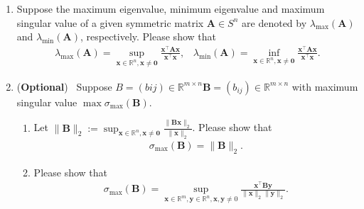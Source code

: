 \documentclass[11pt,letter,notitlepage]{article}
\theoremstyle{definition}
\begin{document}
\newpage
    \begin{exercise}
    \begin{enumerate}
        \item Suppose the maximum eigenvalue, minimum eigenvalue and maximum singular value of a given symmetric matrix $\mathbf{A}\in S^n$ are denoted by $\lambda_{\max}(\mathbf{A})$ and $ \lambda_{\min}(\mathbf{A})$, respectively. Please show that
        \begin{align*}
            \lambda_{\max}(\mathbf{A})=\sup_{\mathbf{x}\in\mathbb{R}^n, \mathbf{x}\not=\mathbf{0}} \frac{\mathbf{x}^\top\mathbf{A}\mathbf{x}}{\mathbf{x}^\top\mathbf{x}},\,\,\,\,\,
            \lambda_{\min}(\mathbf{A})=\inf_{\mathbf{x}\in\mathbb{R}^n, \mathbf{x}\not=\mathbf{0}} \frac{\mathbf{x}^\top\mathbf{A}\mathbf{x}}{\mathbf{x}^\top\mathbf{x}}.
        \end{align*}

        \item (\textbf{Optional}) ~Suppose $B=(bij)\in \mathbb{R}^{m\times n}\mathbf{B}=(b_{ij})\in \mathbb{R}^{m\times n}$ with maximum singular value $\max\sigma_{\max}(\mathbf{B})$.
        \begin{enumerate}
            \item Let $\|\mathbf{B}\|_2:=\sup_{\mathbf{x}\in\mathbb{R}^n, \mathbf{x}\not=\mathbf{0}}\frac{\|\mathbf{Bx}\|_2}{\|\mathbf{x}\|_2}$. Please show that
             \begin{align*}
            \sigma_{\max}(\mathbf{B})=\|\mathbf{B}\|_2.
            \end{align*}

            \item Please show that
        \begin{align*}
            \sigma_{\max}(\mathbf{B})=\sup_{\mathbf{x}\in\mathbb{R}^m, \mathbf{y}\in\mathbb{R}^n, \mathbf{x},\mathbf{y}\not=0}\frac{\mathbf{x}^\top \mathbf{B}\mathbf{y}}{\|\mathbf{x}\|_2\|\mathbf{y}\|_2}.
        \end{align*}
        \end{enumerate}
    \end{enumerate}
    \end{exercise}
\end{document}
